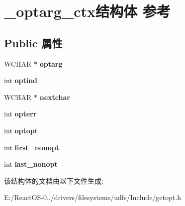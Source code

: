 \hypertarget{struct__optarg__ctx}{}\section{\+\_\+optarg\+\_\+ctx结构体 参考}
\label{struct__optarg__ctx}
\subsection*{Public 属性}
\begin{DoxyCompactItemize}
\item 
\mbox{\label{struct__optarg__ctx_a4729912d008b26ec2f5d2231bc4048fb}} 
W\+C\+H\+AR $\ast$ {\bfseries optarg}
\item 
\mbox{\label{struct__optarg__ctx_a27697976a03455d069b89d897349bdd6}} 
int {\bfseries optind}
\item 
\mbox{\label{struct__optarg__ctx_a485d8c036176e561fe00386636ef0226}} 
W\+C\+H\+AR $\ast$ {\bfseries nextchar}
\item 
\mbox{\label{struct__optarg__ctx_a4349c8ec0c784401fdf237bfabbd3a9d}} 
int {\bfseries opterr}
\item 
\mbox{\label{struct__optarg__ctx_aeff7d4121853ba1c8bf1ca23d96cf3c8}} 
int {\bfseries optopt}
\item 
\mbox{\label{struct__optarg__ctx_aaa8dadd1bbc81bfe4dc68646ea7e4406}} 
int {\bfseries first\+\_\+nonopt}
\item 
\mbox{\label{struct__optarg__ctx_aa584bd919bdab69a1b1fa93cb78f037f}} 
int {\bfseries last\+\_\+nonopt}
\end{DoxyCompactItemize}


该结构体的文档由以下文件生成\+:\begin{DoxyCompactItemize}
\item 
E\+:/\+React\+O\+S-\/0../drivers/filesystems/udfs/\+Include/getopt.\+h\end{DoxyCompactItemize}

